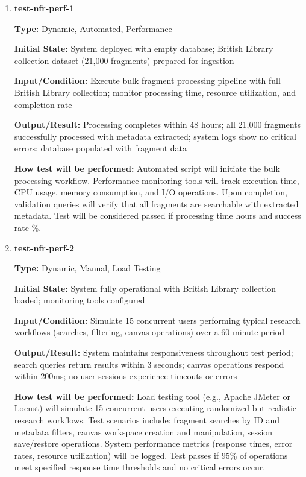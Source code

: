 \documentclass[12pt, titlepage]{article}
\begin{document}
\begin{enumerate}

\item \textbf{test-nfr-perf-1}

\textbf{Type:} Dynamic, Automated, Performance
					
\textbf{Initial State:} System deployed with empty database; British Library collection dataset (21,000 fragments) prepared for ingestion
					
\textbf{Input/Condition:} Execute bulk fragment processing pipeline with full British Library collection; monitor processing time, resource utilization, and completion rate
					
\textbf{Output/Result:} Processing completes within 48 hours; all 21,000 fragments successfully processed with metadata extracted; system logs show no critical errors; database populated with fragment data
					
\textbf{How test will be performed:} Automated script will initiate the bulk processing workflow. Performance monitoring tools will track execution time, CPU usage, memory consumption, and I/O operations. Upon completion, validation queries will verify that all fragments are searchable with extracted metadata. Test will be considered passed if processing time  hours and success rate \%.

\item \textbf{test-nfr-perf-2}

\textbf{Type:} Dynamic, Manual, Load Testing
					
\textbf{Initial State:} System fully operational with British Library collection loaded; monitoring tools configured
					
\textbf{Input/Condition:} Simulate 15 concurrent users performing typical research workflows (searches, filtering, canvas operations) over a 60-minute period
					
\textbf{Output/Result:} System maintains responsiveness throughout test period; search queries return results within 3 seconds; canvas operations respond within 200ms; no user sessions experience timeouts or errors
					
\textbf{How test will be performed:} Load testing tool (e.g., Apache JMeter or Locust) will simulate 15 concurrent users executing randomized but realistic research workflows. Test scenarios include: fragment searches by ID and metadata filters, canvas workspace creation and manipulation, session save/restore operations. System performance metrics (response times, error rates, resource utilization) will be logged. Test passes if 95\% of operations meet specified response time thresholds and no critical errors occur.

\end{enumerate}
\end{document}

